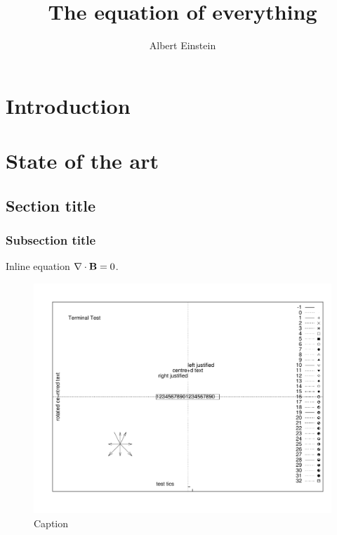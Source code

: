\documentclass[MSc]{podunipdthesis}
\begin{document}
\author{Albert Einstein}
\title{The equation of everything}

\begin{supervisors}
\end{supervisors}

\begin{cosupervisors}
\end{cosupervisors}


\maketitlepage

\tableofcontents

\chapter*{Introduction}

\lipsum[20]

\chapter{State of the art}

\section{Section title}

\subsection{Subsection title}

\lipsum[20] \cite{Resnick:03} \lipsum[5]

\lipsum[40]
Inline equation $\nabla\cdot{\bf B} = 0$.
\lipsum[20]

\begin{figure}[t]
\centering
\includegraphics[width=0.8\columnwidth]{esempio.pdf}
\caption{Caption}
\label{fig:esempio}
\end{figure}
\end{document}
